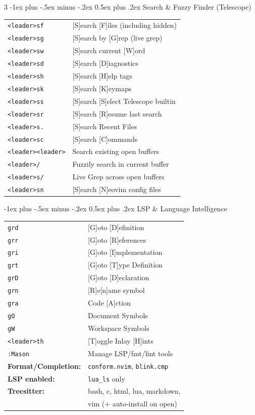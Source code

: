 \documentclass[11pt,landscape]{article}
\makeatletter
\renewcommand{\section}{\@startsection{section}{1}{0mm}%
                                {-1ex plus -.5ex minus -.2ex}%
                                {0.5ex plus .2ex}%
                                {\normalfont\large\bfseries\color{myblue}}}
\makeatother
\begin{document}
\begin{multicols}{3}
\section{Search \& Fuzzy Finder (Telescope)}
\begin{tabular}{@{}ll@{}}
\texttt{<leader>sf} & [S]earch [F]iles (including hidden) \\
\texttt{<leader>sg} & [S]earch by [G]rep (live grep) \\
\texttt{<leader>sw} & [S]earch current [W]ord \\
\texttt{<leader>sd} & [S]earch [D]iagnostics \\
\texttt{<leader>sh} & [S]earch [H]elp tags \\
\texttt{<leader>sk} & [S]earch [K]eymaps \\
\texttt{<leader>ss} & [S]earch [S]elect Telescope builtin \\
\texttt{<leader>sr} & [S]earch [R]esume last search \\
\texttt{<leader>s.} & [S]earch Recent Files \\
\texttt{<leader>sc} & [S]earch [C]ommands \\
\texttt{<leader><leader>} & Search existing open buffers \\
\texttt{<leader>/} & Fuzzily search in current buffer \\
\texttt{<leader>s/} & Live Grep across open buffers \\
\texttt{<leader>sn} & [S]earch [N]eovim config files \\
\end{tabular}

\section{LSP \& Language Intelligence}
\begin{tabular}{@{}ll@{}}
\texttt{grd} & [G]oto [D]efinition \\
\texttt{grr} & [G]oto [R]eferences \\
\texttt{gri} & [G]oto [I]mplementation \\
\texttt{grt} & [G]oto [T]ype Definition \\
\texttt{grD} & [G]oto [D]eclaration \\
\texttt{grn} & [R]e[n]ame symbol \\
\texttt{gra} & Code [A]ction \\
\texttt{gO} & Document Symbols \\
\texttt{gW} & Workspace Symbols \\
\texttt{<leader>th} & [T]oggle Inlay [H]ints \\
\texttt{:Mason} & Manage LSP/fmt/lint tools \\
\hline
\textbf{Format/Completion:} & \texttt{conform.nvim}, \texttt{blink.cmp} \\
\textbf{LSP enabled:} & \texttt{lua\_ls} only \\
\textbf{Treesitter:} & bash, c, html, lua, markdown, \\
& vim (+ auto-install on open) \\
\end{tabular}


\end{multicols}
\end{document}
